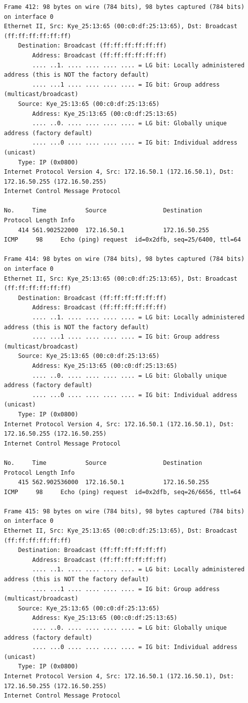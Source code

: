 \documentclass[a4paper,11pt]{article}
\begin{document}
\begin{lstlisting}
Frame 412: 98 bytes on wire (784 bits), 98 bytes captured (784 bits) on interface 0
Ethernet II, Src: Kye_25:13:65 (00:c0:df:25:13:65), Dst: Broadcast (ff:ff:ff:ff:ff:ff)
    Destination: Broadcast (ff:ff:ff:ff:ff:ff)
        Address: Broadcast (ff:ff:ff:ff:ff:ff)
        .... ..1. .... .... .... .... = LG bit: Locally administered address (this is NOT the factory default)
        .... ...1 .... .... .... .... = IG bit: Group address (multicast/broadcast)
    Source: Kye_25:13:65 (00:c0:df:25:13:65)
        Address: Kye_25:13:65 (00:c0:df:25:13:65)
        .... ..0. .... .... .... .... = LG bit: Globally unique address (factory default)
        .... ...0 .... .... .... .... = IG bit: Individual address (unicast)
    Type: IP (0x0800)
Internet Protocol Version 4, Src: 172.16.50.1 (172.16.50.1), Dst: 172.16.50.255 (172.16.50.255)
Internet Control Message Protocol

No.     Time           Source                Destination           Protocol Length Info
    414 561.902522000  172.16.50.1           172.16.50.255         ICMP     98     Echo (ping) request  id=0x2dfb, seq=25/6400, ttl=64

Frame 414: 98 bytes on wire (784 bits), 98 bytes captured (784 bits) on interface 0
Ethernet II, Src: Kye_25:13:65 (00:c0:df:25:13:65), Dst: Broadcast (ff:ff:ff:ff:ff:ff)
    Destination: Broadcast (ff:ff:ff:ff:ff:ff)
        Address: Broadcast (ff:ff:ff:ff:ff:ff)
        .... ..1. .... .... .... .... = LG bit: Locally administered address (this is NOT the factory default)
        .... ...1 .... .... .... .... = IG bit: Group address (multicast/broadcast)
    Source: Kye_25:13:65 (00:c0:df:25:13:65)
        Address: Kye_25:13:65 (00:c0:df:25:13:65)
        .... ..0. .... .... .... .... = LG bit: Globally unique address (factory default)
        .... ...0 .... .... .... .... = IG bit: Individual address (unicast)
    Type: IP (0x0800)
Internet Protocol Version 4, Src: 172.16.50.1 (172.16.50.1), Dst: 172.16.50.255 (172.16.50.255)
Internet Control Message Protocol

No.     Time           Source                Destination           Protocol Length Info
    415 562.902536000  172.16.50.1           172.16.50.255         ICMP     98     Echo (ping) request  id=0x2dfb, seq=26/6656, ttl=64

Frame 415: 98 bytes on wire (784 bits), 98 bytes captured (784 bits) on interface 0
Ethernet II, Src: Kye_25:13:65 (00:c0:df:25:13:65), Dst: Broadcast (ff:ff:ff:ff:ff:ff)
    Destination: Broadcast (ff:ff:ff:ff:ff:ff)
        Address: Broadcast (ff:ff:ff:ff:ff:ff)
        .... ..1. .... .... .... .... = LG bit: Locally administered address (this is NOT the factory default)
        .... ...1 .... .... .... .... = IG bit: Group address (multicast/broadcast)
    Source: Kye_25:13:65 (00:c0:df:25:13:65)
        Address: Kye_25:13:65 (00:c0:df:25:13:65)
        .... ..0. .... .... .... .... = LG bit: Globally unique address (factory default)
        .... ...0 .... .... .... .... = IG bit: Individual address (unicast)
    Type: IP (0x0800)
Internet Protocol Version 4, Src: 172.16.50.1 (172.16.50.1), Dst: 172.16.50.255 (172.16.50.255)
Internet Control Message Protocol


\end{lstlisting}
\end{document}
